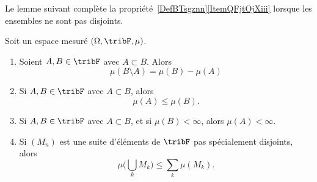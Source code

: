 Le lemme suivant complète la propriété~\ref{DefBTsgznn}\ref{ItemQFjtOjXiii} lorsque les ensembles ne sont pas disjoints.
\begin{lemma} \label{LemPMprYuC}
	Soit un espace mesuré \( (\Omega,\tribF,\mu)\).
	\begin{enumerate}
		\item       \label{ITEMooSUIRooNDVOoB}
		      Soient \( A,B\in\tribF\) avec \( A\subset B\). Alors
		      \begin{equation}
			      \mu(B\setminus A)=\mu(B)-\mu(A)
		      \end{equation}
		\item       \label{ITEMooLEGKooWnYmlf}
		      Si \( A,B\in \tribF\) avec \( A\subset B\), alors
		      \begin{equation}
			      \mu(A)\leq \mu(B).
		      \end{equation}
		\item       \label{ITEMooMCNBooRGVGqA}
		      Si \( A,B\in \tribF\) avec \( A\subset B\), et si \( \mu(B)<\infty\), alors \( \mu(A)<\infty\).
		\item       \label{ITEMooABPYooFQEzqE}
		      Si \( (M_n)\) est une suite d'éléments de \( \tribF\) pas spécialement disjoints, alors
		      \begin{equation}\label{EqWWFooYPCTt}
			      \mu\big( \bigcup_kM_k \big)\leq \sum_{k}\mu(M_k).
		      \end{equation}
	\end{enumerate}
\end{lemma}

